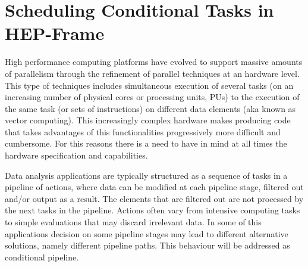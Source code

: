 \chapter{Scheduling Conditional Tasks in HEP-Frame}

 
 High performance computing platforms have evolved to  support massive amounts of parallelism through the refinement of parallel techniques at an hardware level. This type of techniques includes simultaneous execution of several tasks (on an increasing number of physical cores or processing units, PUs) to the execution of the same task (or sets of instructions) on different data elements (aka known as vector computing). 
 This increasingly complex hardware makes producing code that takes advantages of this functionalities progressively more difficult and cumbersome. For this reasons there is a need to have in mind at all times the hardware specification and capabilities. 
 

Data analysis applications are typically structured as a sequence of tasks in a pipeline of actions, where data can be modified at each pipeline stage, filtered out and/or output as a result.
The elements that are filtered out are not processed by the next tasks in the pipeline. 
Actions often vary from intensive computing tasks to simple evaluations that may discard irrelevant data. 
In some of this applications decision on some pipeline stages may lead to different alternative solutions, namely different pipeline paths. 
This behaviour will be addressed as conditional pipeline. 
 
 \newpage
